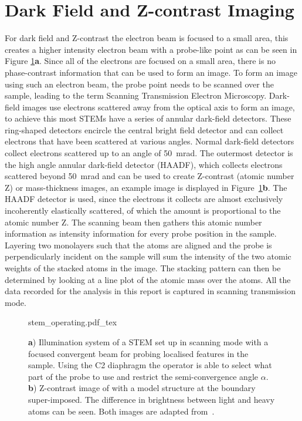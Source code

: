 \section{Dark Field and Z-contrast Imaging}
For dark field and Z-contrast the electron beam is focused to a small area, this creates a higher intensity electron beam with a probe-like point as can be seen in Figure \ref{fig:stem_operating}\textbf{a}. Since all of the electrons are focused on a small area, there is no phase-contrast information that can be used to form an image. To form an image using such an electron beam, the probe point needs to be scanned over the sample, leading to the term Scanning Transmission Electron Microscopy.
Dark-field images use electrons scattered away from the optical axis to form an image, to achieve this most STEMs have a series of annular dark-field detectors.
These ring-shaped detectors encircle the central bright field detector and can collect electrons that have been scattered at various angles. Normal dark-field detectors collect electrons scattered up to an angle of \SI{50}{\milli \radian}. The outermost detector is the high angle annular dark-field detector (HAADF), which collects electrons scattered beyond \SI{50}{\milli \radian} and can be used to create Z-contrast (atomic number Z) or mass-thickness images, an example image is displayed in Figure~\ref{fig:stem_operating}\textbf{b}.
The HAADF detector is used, since the electrons it collects are almost exclusively incoherently elastically scattered, of which the amount is proportional to the atomic number Z.
The scanning beam then gathers this atomic number information as intensity information for every probe position in the sample.
Layering two monolayers such that the atoms are aligned and the probe is perpendicularly incident on the sample will sum the intensity of the two atomic weights of the stacked atoms in the image. The stacking pattern can then be determined by looking at a line plot of the atomic mass over the atoms. All the data recorded for the analysis in this report is captured in scanning transmission mode.

\begin{figure}
    \centering
    \def\svgwidth{.95\linewidth}
    {stem_operating.pdf_tex}
    \caption{\textbf{a}) Illumination system of a STEM set up in scanning mode with a focused convergent beam for probing localised features in the sample. Using the C2 diaphragm the operator is able to select what part of the probe to use and restrict the semi-convergence angle $\alpha$. \textbf{b}) Z-contrast image of  with a model structure at the boundary super-imposed. The difference in brightness between light and heavy atoms can be seen. Both images are adapted from~\cite{Williams2009-ww}. }
    \label{fig:stem_operating}
\end{figure}



